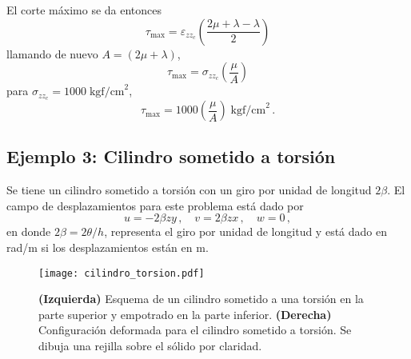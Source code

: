 \documentclass[../notas medios.tex]{subfiles}
\begin{document}
\begin{itemize}
El corte máximo se da entonces
\[\tau_{\max} = \varepsilon _{zz_c}  \left(\dfrac{2\mu + \lambda - 
\lambda}{2}\right)\]
llamando de nuevo $A = (2 \mu + \lambda)$,
\[\tau_{\max} = \sigma_{zz_c} \left(\dfrac{\mu}{A}\right)\]
para  $\sigma_{zz_c} = 1000 \; \text{kgf/cm}^2$,
\[\tau_{\max} = 1000 \left(\dfrac{\mu}{A}\right) \; \text{kgf/cm}^2\, .\]

\end{itemize}

\subsection*{Ejemplo 3: Cilindro sometido a torsión}

Se tiene un cilindro sometido a torsión con un giro por unidad de longitud $2\beta$. El campo de desplazamientos para este problema está dado por
\[
  u = -2\beta zy\, ,\quad
  v = 2\beta zx\, , \quad
  w = 0\, ,
\]
en donde $2\beta = 2\theta/h$, representa el giro por unidad de longitud y está dado en rad/m si los desplazamientos están en m.
\begin{figure}[H]
 \centering
 \texttt{[image: cilindro\_torsion.pdf]} 
 \caption{\textbf{(Izquierda)} Esquema de un cilindro sometido a una torsión en la parte superior y empotrado en la parte inferior. \textbf{(Derecha)} Configuración deformada para el cilindro sometido a torsión. Se dibuja una rejilla sobre el sólido por claridad.}
 \label{fig:cilindro_torsion}
\end{figure}
\end{document}
